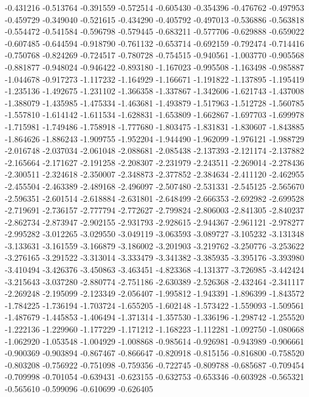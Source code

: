 -0.431216
-0.513764
-0.391559
-0.572514
-0.605430
-0.354396
-0.476762
-0.497953
-0.459729
-0.349040
-0.521615
-0.434290
-0.405792
-0.497013
-0.536886
-0.563818
-0.554472
-0.541584
-0.596798
-0.579445
-0.683211
-0.577706
-0.629888
-0.659022
-0.607485
-0.644594
-0.918790
-0.761132
-0.653714
-0.692159
-0.792474
-0.714416
-0.750768
-0.824269
-0.724517
-0.780728
-0.754515
-0.940561
-1.003770
-0.905568
-0.881877
-0.948024
-0.946422
-0.893180
-1.167023
-0.995508
-1.163498
-0.985887
-1.044678
-0.917273
-1.117232
-1.164929
-1.166671
-1.191822
-1.137895
-1.195419
-1.235136
-1.492675
-1.231102
-1.366358
-1.337867
-1.342606
-1.621743
-1.437008
-1.388079
-1.435985
-1.475334
-1.463681
-1.493879
-1.517963
-1.512728
-1.560785
-1.557810
-1.614142
-1.611534
-1.628831
-1.653809
-1.662867
-1.697703
-1.699978
-1.715981
-1.749486
-1.758918
-1.777680
-1.803475
-1.831831
-1.830607
-1.843885
-1.864626
-1.886243
-1.909755
-1.952204
-1.944490
-1.962099
-1.976121
-1.988729
-2.016748
-2.037034
-2.061048
-2.088681
-2.085438
-2.137393
-2.121174
-2.137882
-2.165664
-2.171627
-2.191258
-2.208307
-2.231979
-2.243511
-2.269014
-2.278436
-2.300511
-2.324618
-2.350007
-2.348873
-2.377852
-2.384634
-2.411120
-2.462955
-2.455504
-2.463389
-2.489168
-2.496097
-2.507480
-2.531331
-2.545125
-2.565670
-2.596351
-2.601514
-2.618884
-2.631801
-2.648499
-2.666353
-2.692982
-2.699528
-2.719691
-2.736157
-2.777794
-2.772627
-2.799824
-2.806003
-2.841305
-2.840237
-2.862734
-2.873947
-2.902155
-2.931793
-2.928615
-2.944367
-2.961121
-2.978277
-2.995282
-3.012265
-3.029550
-3.049119
-3.063593
-3.089727
-3.105232
-3.131348
-3.133631
-3.161559
-3.166879
-3.186002
-3.201903
-3.219762
-3.250776
-3.253622
-3.276165
-3.291522
-3.313014
-3.333479
-3.341382
-3.385935
-3.395176
-3.393980
-3.410494
-3.426376
-3.450863
-3.463451
-4.823368
-4.131377
-3.726985
-3.442424
-3.215643
-3.037280
-2.880774
-2.751186
-2.630389
-2.526368
-2.432464
-2.341117
-2.269248
-2.195099
-2.123349
-2.056407
-1.995812
-1.943391
-1.896399
-1.843572
-1.784225
-1.736194
-1.703724
-1.655205
-1.602148
-1.573422
-1.559093
-1.509561
-1.487679
-1.445853
-1.406494
-1.371314
-1.357530
-1.336196
-1.298742
-1.255520
-1.222136
-1.229960
-1.177229
-1.171212
-1.168223
-1.112281
-1.092750
-1.080668
-1.062920
-1.053548
-1.004929
-1.008868
-0.985614
-0.926981
-0.943989
-0.906661
-0.900369
-0.903894
-0.867467
-0.866647
-0.820918
-0.815156
-0.816800
-0.758520
-0.803208
-0.756922
-0.751098
-0.759356
-0.722745
-0.809788
-0.685687
-0.709454
-0.709998
-0.701054
-0.639431
-0.623155
-0.632753
-0.653346
-0.603928
-0.565321
-0.565610
-0.599096
-0.610699
-0.626405

